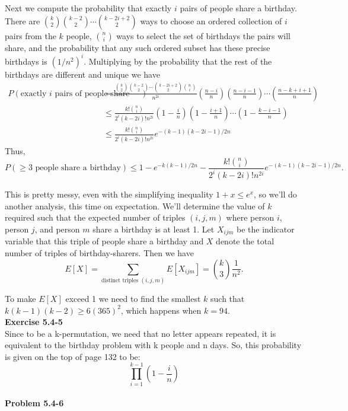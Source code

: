 \documentclass{article}
\begin{document}
Next we compute the probability that exactly $i$ pairs of people share a birthday.  There are ${k \choose 2}{k-2 \choose 2} \cdots {k-2i+2 \choose 2}$ ways to choose an ordered collection of $i$ pairs from the $k$ people, ${n \choose i}$ ways to select the set of birthdays the pairs will share, and the probability that any such ordered subset has these precise birthdays is $(1/n^2)^i$.  Multiplying by the probability that the rest of the birthdays are different and unique we have
\begin{align*}
 P(\mbox{exactly $i$ pairs of people share birthdays}) &= \frac{{k \choose 2}{k-2 \choose 2} \cdots {k-2i+2 \choose 2}{n \choose i}}{n^{2i}} \left(\frac{n-i}{n}\right)\left(\frac{n-i-1}{n}\right) \cdots \left(\frac{n-k+i+1}{n}\right)\\
&\leq \frac{k! {n \choose i}}{2^i (k-2i)! n^{2i}}\left(1 - \frac{i}{n} \right)\left(1 - \frac{i+1}{n} \right) \cdots \left(1 - \frac{k-i-1}{n}\right) \\
&\leq \frac{k! {n \choose i}}{2^i (k-2i)! n^{2i}} e^{-(k-1)(k-2i-1)/2n}
\end{align*}
 Thus, 
\[ P(\geq 3 \mbox{ people share a birthday}) \leq 1 - e^{-k(k-1)/2n} - \frac{k! {n \choose i}}{2^i (k-2i)! n^{2i}} e^{-(k-1)(k-2i-1)/2n}.\]

This is pretty messy, even with the simplifying inequality $1+x \leq e^x$, so we'll do another analysis, this time on expectation.  We'll determine the value of $k$ required such that the expected number of triples $(i,j,m)$ where person $i$, person $j$, and person $m$ share a birthday is at least 1.  Let $X_{ijm}$ be the indicator variable that this triple of people share a birthday and $X$ denote the total number of triples of birthday-sharers.  Then we have
\[ E[X] = \sum_{\mbox{distinct triples }(i,j,m)} E[X_{ijm}] = {k \choose 3}\frac{1}{n^2}.\]

To make $E[X]$ exceed 1 we need to find the smallest $k$ such that $k(k-1)(k-2) \geq 6(365)^2$, which happens when $k = 94$.\\

\noindent\textbf{Exercise 5.4-5}\\

Since to be a k-permutation, we need that no letter appears repeated, it is equivalent to the birthday problem with k people and n days. So, this probability is given on the top of page 132 to be:
\[
\prod_{i=1}^{k-1} \left(1-\frac{i}{n}\right)
\]\\

\noindent\textbf{Problem 5.4-6}\\
\end{document}
